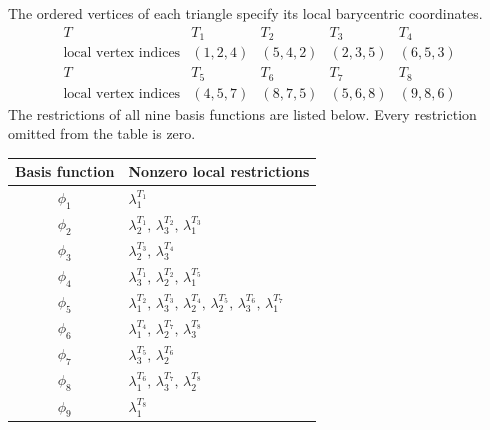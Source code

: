 \documentclass[11pt,a4paper]{article}
\begin{document}
\begin{center}
\end{center}
The ordered vertices of each triangle specify its local barycentric coordinates.
\[
\begin{array}{c|cccc}
T & T_1&T_2&T_3&T_4\\
\text{local vertex indices}&(1,2,4)&(5,4,2)&(2,3,5)&(6,5,3)\\[3pt]
T & T_5&T_6&T_7&T_8\\
\text{local vertex indices}&(4,5,7)&(8,7,5)&(5,6,8)&(9,8,6)
\end{array}
\]
The restrictions of all nine basis functions are listed below. Every restriction omitted from the table is zero.

\begin{center}
\begin{tabular}{c l}
\toprule
Basis function & Nonzero local restrictions \\
\midrule
\(\phi_1\) & \(\lambda_1^{T_1}\) \\
\(\phi_2\) & \(\lambda_2^{T_1},\,\lambda_3^{T_2},\,\lambda_1^{T_3}\) \\
\(\phi_3\) & \(\lambda_2^{T_3},\,\lambda_3^{T_4}\) \\
\(\phi_4\) & \(\lambda_3^{T_1},\,\lambda_2^{T_2},\,\lambda_1^{T_5}\) \\
\(\phi_5\) & \(\lambda_1^{T_2},\,\lambda_3^{T_3},\,\lambda_2^{T_4},\,
              \lambda_2^{T_5},\,\lambda_3^{T_6},\,\lambda_1^{T_7}\) \\
\(\phi_6\) & \(\lambda_1^{T_4},\,\lambda_2^{T_7},\,\lambda_3^{T_8}\) \\
\(\phi_7\) & \(\lambda_3^{T_5},\,\lambda_2^{T_6}\) \\
\(\phi_8\) & \(\lambda_1^{T_6},\,\lambda_3^{T_7},\,\lambda_2^{T_8}\) \\
\(\phi_9\) & \(\lambda_1^{T_8}\) \\
\bottomrule
\end{tabular}
\end{center}
\end{document}
